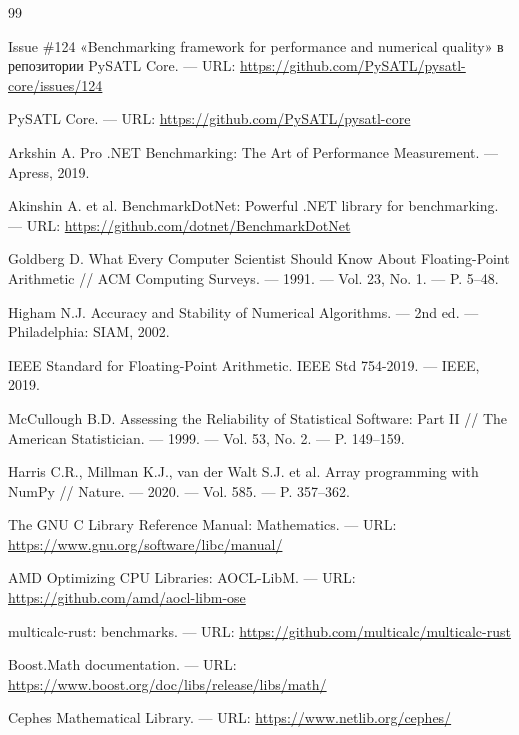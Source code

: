 \documentclass[12pt,a4paper]{article}
\begin{document}
\renewcommand{\refname}{Список литературы}
\label{sec:bibliography}
\begin{thebibliography}{99}

 Issue \#124 «Benchmarking framework for
performance and numerical quality» в репозитории PySATL Core. ---
URL: \url{https://github.com/PySATL/pysatl-core/issues/124}

 PySATL Core. ---
URL: \url{https://github.com/PySATL/pysatl-core}

 Arkshin A.
Pro .NET Benchmarking: The Art of Performance Measurement. ---
Apress, 2019.

 Akinshin A. et al.
BenchmarkDotNet: Powerful .NET library for benchmarking. ---
URL: \url{https://github.com/dotnet/BenchmarkDotNet}

 Goldberg D.
What Every Computer Scientist Should Know About Floating-Point
Arithmetic // ACM Computing Surveys. --- 1991. --- Vol. 23, No. 1.
--- P. 5--48.

 Higham N.J.
Accuracy and Stability of Numerical Algorithms. ---
2nd ed. --- Philadelphia: SIAM, 2002.

 IEEE Standard for Floating-Point Arithmetic.
IEEE Std 754-2019. --- IEEE, 2019.

 McCullough B.D.
Assessing the Reliability of Statistical Software: Part II //
The American Statistician. --- 1999. --- Vol. 53, No. 2.
--- P. 149--159.

 Harris C.R., Millman K.J., van der Walt S.J. et al.
Array programming with NumPy // Nature. --- 2020. --- Vol. 585.
--- P. 357--362.

 The GNU C Library Reference Manual: Mathematics. ---
URL: \url{https://www.gnu.org/software/libc/manual/}

 AMD Optimizing CPU Libraries: AOCL-LibM. ---
URL: \url{https://github.com/amd/aocl-libm-ose}

 multicalc-rust: benchmarks. ---
URL: \url{https://github.com/multicalc/multicalc-rust}

 Boost.Math documentation. ---
URL: \url{https://www.boost.org/doc/libs/release/libs/math/}

 Cephes Mathematical Library. ---
URL: \url{https://www.netlib.org/cephes/}


\end{thebibliography}
\end{document}
